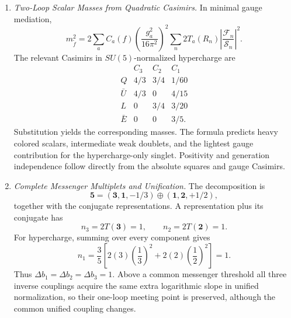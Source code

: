 \begin{enumerate}
  \begin{enumerate}
    \item \emph{Two-Loop Scalar Masses from Quadratic Casimirs.}
    In minimal gauge mediation,
      \[
        m_{\widetilde f}^2
          =2\sum_a C_a(f)
           \left(\frac{g_a^2}{16\pi^2}\right)^2
           \sum_n2T_a(R_n)
           \left|\frac{\mathcal F_n}{\mathcal S_n}\right|^2.
      \]
      The relevant Casimirs in \(SU(5)\)-normalized hypercharge are
      \[
      \begin{array}{c|ccc}
        &C_3&C_2&C_1\\ \hline
        Q&4/3&3/4&1/60\\
        \bar U&4/3&0&4/15\\
        L&0&3/4&3/20\\
        \bar E&0&0&3/5 .
      \end{array}
      \]
      Substitution yields the corresponding masses.  The formula predicts
      heavy colored scalars, intermediate weak doublets, and the lightest
      gauge contribution for the hypercharge-only singlet.  Positivity and
      generation independence follow directly from the absolute squares and
      gauge Casimirs.
    \item \emph{Complete Messenger Multiplets and Unification.}
    The decomposition is
      \[
        \boldsymbol5=(\boldsymbol3,\boldsymbol1,-1/3)
          \oplus(\boldsymbol1,\boldsymbol2,+1/2),
      \]
      together with the conjugate representations.  A representation plus
      its conjugate has
      \[
        n_3=2T(\boldsymbol3)=1,\qquad
        n_2=2T(\boldsymbol2)=1.
      \]
      For hypercharge, summing over every component gives
      \[
        n_1=\frac35\left[
          2(3)\left(\frac13\right)^2
          +2(2)\left(\frac12\right)^2\right]
          =1.
      \]
      Thus \(\Delta b_1=\Delta b_2=\Delta b_3=1\).  Above a common messenger
      threshold all three inverse couplings acquire the same extra
      logarithmic slope in unified normalization, so their one-loop meeting
      point is preserved, although the common unified coupling changes.
  \end{enumerate}


\end{enumerate}
